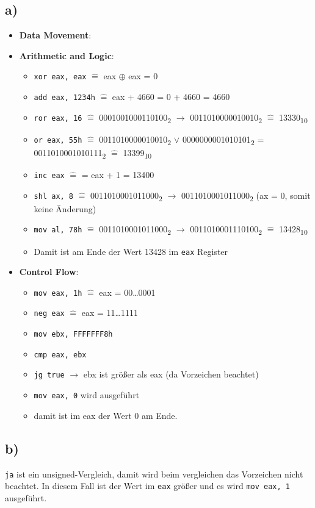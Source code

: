 \documentclass[]{scrreprt}
\begin{document}
\subsection*{a)}
\begin{itemize}
	\item \textbf{Data Movement}:
	
	\item  \textbf{Arithmetic and Logic}:
	\begin{itemize}
		\item \texttt{xor eax, eax} $\hat{=}$ eax $\oplus$ eax = 0
		\item \texttt{add eax, 1234h} $\hat{=}$ eax + 4660 = 0 + 4660 = 4660
		\item \texttt{ror eax, 16} $\hat{=}$ {0001001000110100}\textsubscript{2} $\rightarrow$ {0011010000010010}\textsubscript{2} $\hat{=}$  {13330}\textsubscript{10}
		\item \texttt{or eax, 55h} $\hat{=}$ {0011010000010010}\textsubscript{2} $\vee$ {0000000001010101}\textsubscript{2} = {0011010001010111}\textsubscript{2} $\hat{=}$ {13399}\textsubscript{10}
		\item \texttt{inc eax} $\hat{=}$ = eax + 1 = 13400
		\item \texttt{shl ax, 8} $\hat{=}$ 0011010001011000\textsubscript{2} $\rightarrow$ 0011010001011000\textsubscript{2} (ax = 0, somit keine Änderung)
		\item  \texttt{mov al, 78h} $\hat{=}$ 0011010001011000\textsubscript{2} $\rightarrow$ 0011010001110100\textsubscript{2} $\hat{=}$ 13428\textsubscript{10}
		\item Damit ist am Ende der Wert 13428 im \texttt{eax} Register
	\end{itemize}
	
	\item \textbf{Control Flow}:
	\begin{itemize}
		\item \texttt{mov eax, 1h} $\hat{=}$ eax = 00\dots0001
		\item \texttt{neg eax} $\hat{=}$ eax = 11\dots1111
		\item \texttt{mov ebx, FFFFFFF8h}
		\item \texttt{cmp eax, ebx} 
		\item \texttt{jg true} $\rightarrow$ ebx ist größer als eax (da Vorzeichen beachtet)
		\item \texttt{mov eax, 0} wird ausgeführt
		\item damit ist im eax der Wert 0 am Ende.
	\end{itemize}
\end{itemize}
\subsection*{b)}
\texttt{ja} ist ein unsigned-Vergleich, damit wird beim vergleichen das Vorzeichen nicht beachtet. In diesem Fall ist der Wert im \texttt{eax} größer und es wird \texttt{mov eax, 1} ausgeführt.
\end{document}
